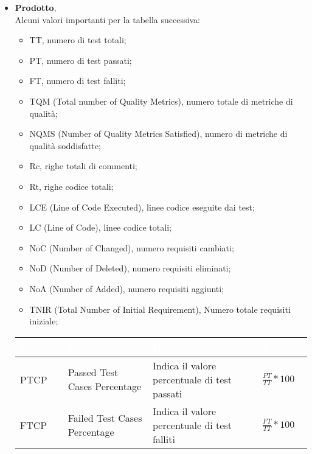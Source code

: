 \begin{itemize}
            \item \textbf{Prodotto}, \\
            Alcuni valori importanti per la tabella successiva:
            \begin{itemize}
                \item TT, numero di test totali;
                \item PT, numero di test passati;
                \item FT, numero di test falliti;
                \item TQM (Total number of Quality Metrics), numero totale di metriche di qualità;
                \item NQMS (Number of Quality Metrics Satisfied), numero di metriche di qualità soddisfatte;
                \item Rc, righe totali di commenti;
                \item Rt, righe codice totali;
                \item LCE (Line of Code Executed), linee codice eseguite dai test;
                \item LC (Line of Code), linee codice totali;
                \item NoC (Number of Changed), numero requisiti cambiati;
                \item NoD (Number of Deleted), numero requisiti eliminati;
                \item NoA (Number of Added), numero requisiti aggiunti;
                \item TNIR (Total Number of Initial Requirement), Numero totale requisiti iniziale;
            \end{itemize}
            \renewcommand\arraystretch{1,5}
            \begin{center}
                \begin{tabular}{|p{1.5cm}|p{3cm}|p{4cm}|p{5cm}|} \hline
                  \rowcolor[HTML]{036400}
                  \textcolor[HTML]{FFFFFF}{\textbf{Metrica}} & \textcolor[HTML]{FFFFFF}{\textbf{Nome}} & \textcolor[HTML]{FFFFFF}{\textbf{Descrizione}} & \textcolor[HTML]{FFFFFF}{\textbf{Formula}}    \\ \hline
                  \rowcolor[HTML]{C0C0C0}
                  PTCP & Passed Test Cases Percentage & Indica il valore percentuale di test passati & $\frac{PT}{TT}*100$  \\ \hline
                  \rowcolor[HTML]{EFEFEF}
                  FTCP & Failed Test Cases Percentage & Indica il valore percentuale di test falliti & $\frac{FT}{TT}*100$  \\ \hline

\end{tabular}
\end{center}
\end{itemize}
